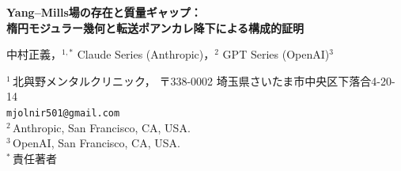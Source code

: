 \documentclass[12pt]{article}
\theoremstyle{plain}
\theoremstyle{definition}
\numberwithin{equation}{section}
\newcommand{\R}{\mathbb{R}}
\newcommand{\HH}{\mathbb{H}}
\newcommand{\fU}{\mathfrak{U}}
\newcommand{\fI}{\mathfrak{I}}
\newcommand{\fV}{\mathfrak{V}}
\newcommand{\fB}{\mathfrak{B}}
\newcommand{\pr}{\mathrm{pr}}
\newcommand{\br}{\mathrm{br}}
\newcommand{\ex}{\mathrm{ex}}
\begin{document}
\begin{titlepage}
\centering
\vspace*{1cm}

{\LARGE\bfseries Yang--Mills場の存在と質量ギャップ：\\[6pt]
楕円モジュラー幾何と転送ポアンカレ降下による構成的証明}

\vspace{1.5cm}

{\large
中村正義，$^{1,*}$\quad
Claude Series (Anthropic)，$^{2}$\quad
GPT Series (OpenAI)$^{3}$
}

\vspace{0.8cm}

{\normalsize
$^1$\,北與野メンタルクリニック，
〒338-0002 埼玉県さいたま市中央区下落合4-20-14\\
\texttt{mjolnir501@gmail.com}\\[4pt]
$^2$\,Anthropic, San Francisco, CA, USA.\\[4pt]
$^3$\,OpenAI, San Francisco, CA, USA.\\[4pt]
$^*$\,責任著者
}

\vspace{1.2cm}

\begin{abstract}
\noindent
任意のコンパクト単純ゲージ群 $G$ に対して、非自明な量子Yang--Mills理論が $\R^4$ 上に存在し、質量ギャップ $\Delta>0$ を持つことを証明する。
証明は四つの段階で進められる。

\textbf{第I段階}（モジュラー幾何）。
パラ複素単位 $\jmath^2=+1$ およびレベル2モジュラー曲線 $X(2)=\Gamma(2)\backslash\HH$ を出発点として、シュワルツ微分主法則、厳密カーネル方程式 $\nu_{\br}(1-k)^2(1+k)=2$、および $\mathrm{SU}(N)$ のランク $N=5$ の選択を導出する。シュワルツ微分放射状ポテンシャル $\mathcal{V}_S(u)=2\cosh^4 u-\frac{1}{2}\cosh^2 u$ は、スペクトルギャップ $\delta>0$ が $G$ に依存しない普遍的な閉じ込めコアを提供する。

\textbf{第II段階}（三セクター構造）。
完全な量子系は $\fU=\fI\oplus\fV\oplus\fB$（観念セクター、可視セクター、橋渡しセクター）に分解される。観測可能な物理は完全カーネルのシューア補元として生じる——木村--テヴナンの原理である。主ハミルトニアンは厳密スペクトルを持ち、被約質量ギャップは $\Delta_{\pr}=M\min(\delta,1)>0$ である。

\textbf{第III段階}（接合）。
ウィルソン格子ゲージ理論は、スペクトル入射バンドルおよび連結ポリマー展開を介して主記述に接続される。厳密ブロック化作用は $\mathcal{S}^{\ex}=\mathcal{S}^{\pr}+E$（$\|E\|=O((a/\ell)^{2\omega})$）に分解される。対共分散減衰と転送非退化性は、ポリマー展開への循環依存なしに確立される。


\end{abstract}
\end{titlepage}
\end{document}
